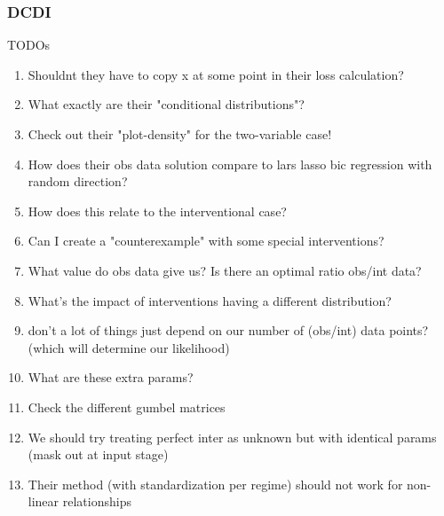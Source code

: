 \documentclass{article}
\begin{document}
\subsubsection{DCDI}
\noindent
TODOs
\begin{enumerate}
    \item Shouldnt they have to copy x at some point in their loss calculation?
    \item What exactly are their "conditional distributions"?
    \item Check out their "plot-density" for the two-variable case!
    \item How does their obs data solution compare to lars lasso bic regression with random direction? 
    \item How does this relate to the interventional case?
    \item Can I create a "counterexample" with some special interventions?
    \item What value do obs data give us? Is there an optimal ratio obs/int 
    data?
    \item What's the impact of interventions having a different distribution?
    \item don't a lot of things just depend on our number of (obs/int) data points? (which will determine our likelihood)
    \item What are these extra params?
    \item Check the different gumbel matrices
    \item We should try treating perfect inter as unknown but with identical params (mask out at input stage)
    \item Their method (with standardization per regime) should not work for non-linear relationships
\end{enumerate}
\end{document}
